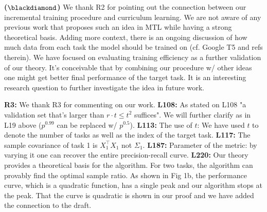 \documentclass{article}
\begin{document}
\vspace{-0.045in}
\textbf{($\blackdiamond$)}  We thank R2 for pointing out the connection between our incremental training procedure and curriculum learning.
We are not aware of any previous work that proposes such an idea in MTL while having a strong theoretical basis.
Adding more context, there is an ongoing discussion of how much data from each task the model should be trained on (cf. Google T5 and refs therein).
We have focused on evaluating training efficiency as a further validation of our theory.
It's conceivable that by combining our procedure w/ other ideas one might get better final performance of the target task.
It is an interesting research question to further investigate the idea in future work.

\vspace{-0.025in}
\textbf{R3:}
We thank R3 for commenting on our work.
\textbf{L108:}
As stated on L108  "a validation set that's larger than $r\cdot t \le t^2$ suffices". We will further clarify as in L19 above ($p^{0.99}$ can be replaced w/ $p^{0.5}$).
\textbf{L113:} The use of $t$: We have used $t$ to denote the number of tasks as well as the index of the target task.
\textbf{L117:} The sample covariance of task 1 is  $X_1^{\top}X_1$ not $\Sigma_1$.
\textbf{L187:} Parameter of the metric: by varying it one can recover the entire precision-recall curve.
\textbf{L220:} Our theory provides a theoretical basis for the algorithm.
For two tasks, the algorithm can provably find the optimal sample ratio. As shown in Fig 1b, the performance curve, which is a quadratic function, has a single peak and our algorithm stops at the peak.
That the curve is quadratic is shown in our proof and we have added the connection to the draft.
\end{document}
